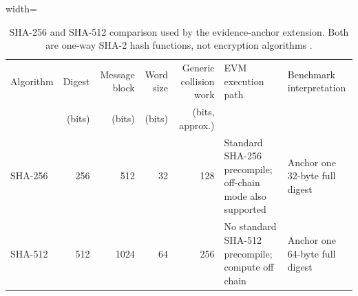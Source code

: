\begin{table}[!t]
\centering
\caption{SHA-256 and SHA-512 comparison used by the evidence-anchor extension.
Both are one-way SHA-2 hash functions, not encryption algorithms
\cite{nistFips1804}.}
\label{tab:sha2-semantics}
\begin{adjustbox}{width=\textwidth}
\begin{tabular}{lrrrrll}
\toprule
Algorithm & Digest & Message block & Word size & Generic collision work &
EVM execution path & Benchmark interpretation \\
& (bits) & (bits) & (bits) & (bits, approx.) & & \\
\midrule
SHA-256 & 256 & 512 & 32 & 128 &
Standard SHA-256 precompile; off-chain mode also supported &
Anchor one 32-byte full digest \\
SHA-512 & 512 & 1024 & 64 & 256 &
No standard SHA-512 precompile; compute off chain &
Anchor one 64-byte full digest \\
\bottomrule
\end{tabular}
\end{adjustbox}
\end{table}
